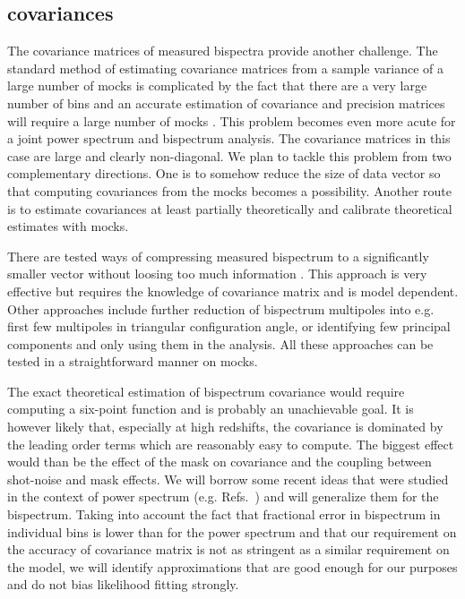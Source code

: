 \subsection*{covariances}

The covariance matrices of measured bispectra provide another challenge. The
standard method of estimating covariance matrices from a sample variance of a
large number of mocks is complicated by the fact that there are a very large
number of bins and an accurate estimation of covariance and precision matrices
will require a large number of mocks
\cite{2006MNRAS.371.1188H,2007A&A...464..399H,2013MNRAS.432.1928T,2013PhRvD..88f3537D,2014MNRAS.439.2531P,2014MNRAS.442.2728T}.
This problem becomes even more acute for a joint power spectrum and bispectrum
analysis. The covariance matrices in this case are large and clearly
non-diagonal.  We plan to tackle this problem from two complementary
directions. One is to somehow reduce the size of data vector so that computing
covariances from the mocks becomes a possibility. Another route is to estimate
covariances at least partially theoretically and calibrate theoretical
estimates with mocks. 

There are tested ways of compressing measured bispectrum to a significantly
smaller vector without loosing too much information
\cite{2000MNRAS.317..965H,2016PhRvD..93h3525Z,2017MNRAS.471.1581B,2017MNRAS.472.4244H,2018MNRAS.476.4045G}.
This approach is very effective but requires the knowledge of covariance matrix
and is model dependent. Other approaches include further reduction of
bispectrum multipoles into e.g. first few multipoles in triangular
configuration angle, or identifying few principal components and only using
them in the analysis. All these approaches can be tested in a straightforward
manner on mocks.

The exact theoretical estimation of bispectrum covariance would require
computing a six-point function and is probably an unachievable goal. It is
however likely that, especially at high redshifts, the covariance is dominated
by the leading order terms which are reasonably easy to compute. The biggest
effect would than be the effect of the mask on covariance and the coupling
between shot-noise and mask effects. We will borrow some recent ideas that were
studied in the context of power spectrum (e.g. Refs.~\cite{2008MNRAS.389..766P,2015MNRAS.454.4326P,2016MNRAS.457..993P,2016MNRAS.460.1567P,2016MNRAS.462.2681O}) and will
generalize them for the bispectrum. Taking into account the fact that
fractional error in bispectrum in individual bins is lower than for the power
spectrum and that our requirement on the accuracy of covariance matrix is not
as stringent as a similar requirement on the model, we will identify
approximations that are good enough for our purposes and do not bias likelihood
fitting strongly. 

